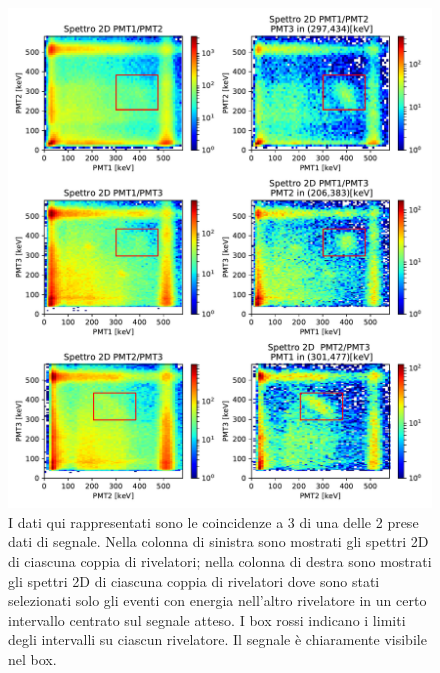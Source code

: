  \begin{figure}[h]
	\hspace{-4em}
	\includegraphics[width=44em]{immagini/3gamma_signal}
	\caption{\label{fig:3gamma_signal} I dati qui rappresentati sono le coincidenze a 3 di una delle 2 prese dati di segnale. Nella colonna di sinistra sono mostrati gli spettri 2D di ciascuna coppia di rivelatori; nella colonna di destra sono mostrati gli spettri 2D di ciascuna coppia di rivelatori dove sono stati selezionati solo gli eventi con energia nell'altro rivelatore in un certo intervallo centrato sul segnale atteso. I box rossi indicano i limiti degli intervalli su ciascun rivelatore. Il segnale è chiaramente visibile nel box.}
\end{figure}

